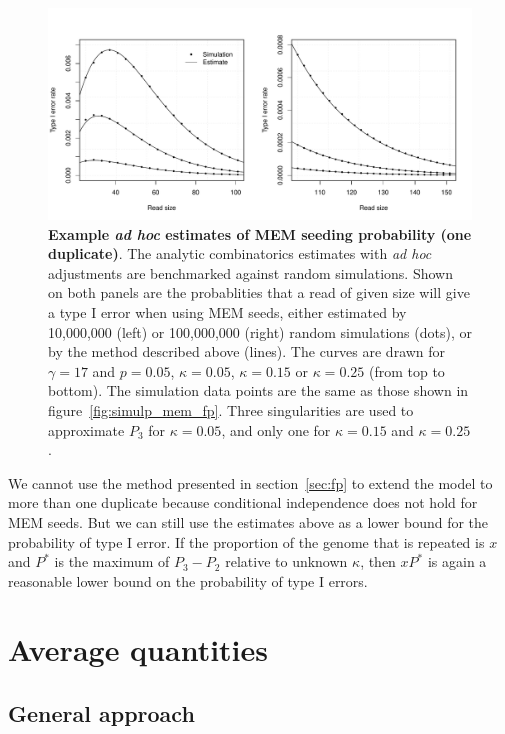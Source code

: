 \documentclass{article}
\begin{document}
\begin{figure}[h]
\centering
\includegraphics[scale=0.445]{simulp_mem_fp2.pdf}
\caption{\textbf{Example \textit{ad hoc} estimates of MEM seeding
probability (one duplicate)}. The analytic combinatorics estimates with
\textit{ad hoc} adjustments are benchmarked against random simulations.
Shown on both panels are the probablities that a read of given size will
give a type I error when using MEM seeds, either estimated by 10,000,000
(left) or 100,000,000 (right) random simulations (dots), or by the method
described above (lines). The curves are drawn for $\gamma=17$ and
$p=0.05$, $\kappa=0.05$, $\kappa=0.15$ or $\kappa=0.25$ (from top to
bottom). The simulation data points are the same as those shown in
figure~\ref{fig:simulp_mem_fp}. Three singularities are used to
approximate $P_3$ for $\kappa=0.05$, and only one for $\kappa=0.15$ and
$\kappa=0.25$.}
\label{fig:simulp_mem_fp2}
\end{figure}

We cannot use the method presented in section~\ref{sec:fp} to extend the
model to more than one duplicate because conditional independence does not
hold for MEM seeds. But we can still use the estimates above as a lower
bound for the probability of type I error. If the proportion of the genome
that is repeated is $x$ and $P^*$ is the maximum of $P_3-P_2$ relative to
unknown $\kappa$, then $xP^*$ is again a reasonable lower bound on the
probability of type I errors.




\section{Average quantities}
\label{sec:av}

\subsection{General approach}
\label{sec:genapp}
\end{document}
